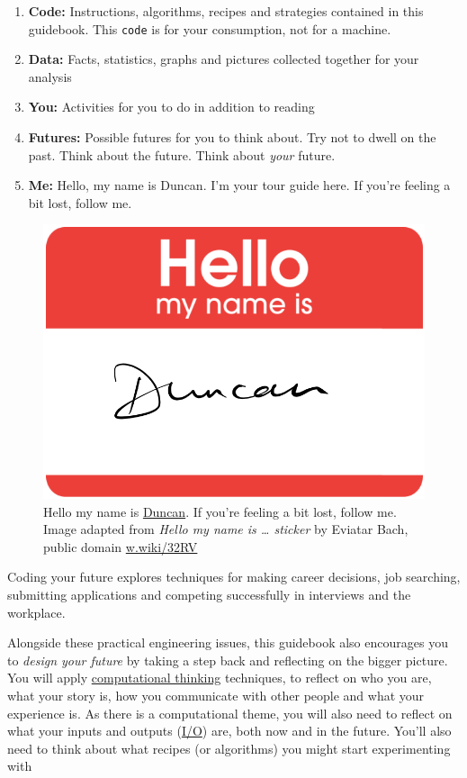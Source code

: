 \documentclass[
]{book}
\providecommand{\tightlist}{%
  \setlength{\itemsep}{0pt}\setlength{\parskip}{0pt}}
\begin{document}
\begin{enumerate}
\def\labelenumi{\arabic{enumi}.}
\tightlist
\item
  \textbf{Code:} Instructions, algorithms, recipes and strategies contained in this guidebook. This \texttt{code} is for your consumption, not for a machine.
\item
  \textbf{Data:} Facts, statistics, graphs and pictures collected together for your analysis
\item
  \textbf{You:} Activities for you to do in addition to reading
\item
  \textbf{Futures:} Possible futures for you to think about. Try not to dwell on the past. Think about the future. Think about \emph{your} future. \citep{thinkaboutthefuture, wroteforluck}
\item
  \textbf{Me:} Hello, my name is Duncan. I'm your tour guide here. If you're feeling a bit lost, follow me.
\end{enumerate}

\begin{figure}

{\centering \includegraphics[width=0.69\linewidth]{images/Hello-my-name-is-Duncan} 

}

\caption{Hello my name is \href{https://en.wikipedia.org/wiki/Duncan_(given_name)}{Duncan}. If you're feeling a bit lost, follow me. Image adapted from \emph{Hello my name is \ldots{} sticker} by Eviatar Bach, public domain \href{https://w.wiki/32RV}{w.wiki/32RV}}\label{fig:hello-my-name-fig}
\end{figure}



Coding your future explores techniques for making career decisions, job searching, submitting applications and competing successfully in interviews and the workplace.

Alongside these practical engineering issues, this guidebook also encourages you to \emph{design your future} by taking a step back and reflecting on the bigger picture. You will apply \href{https://en.wikipedia.org/wiki/Computational_thinking}{computational thinking} techniques, to reflect on who you are, what your story is, how you communicate with other people and what your experience is. As there is a computational theme, you will also need to reflect on what your inputs and outputs (\href{https://en.wikipedia.org/wiki/Input/output}{I/O}) are, both now and in the future. You'll also need to think about what recipes (or algorithms) you might start experimenting with
\end{document}
